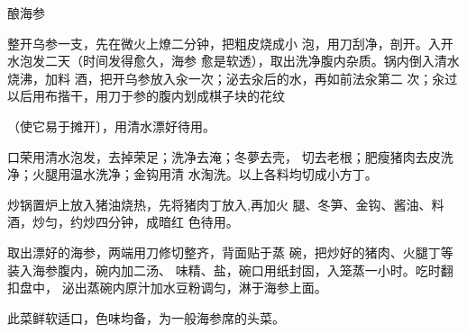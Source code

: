 \begin{recipe}[一品海参]{酿海参}

\ingredients


\cooking

\step 整开乌参一支，先在微火上燎二分钟，把粗皮烧成小 泡，用刀刮净，剖开。入开水泡发二天（时间发得愈久，海参 愈是软透），取出洗净腹内杂质。锅内倒入清水烧沸，加料 酒，把开乌参放入汆一次；泌去汆后的水，再如前法汆第二 次；汆过以后用布揩干，用刀于参的腹内划成棋子块的花纹

（使它易于摊开〕，用清水漂好待用。

\step 口荣用清水泡发，去掉荣足；洗净去淹；冬夢去壳， 切去老根；肥瘦猪肉去皮洗净；火腿用温水洗净；金钩用清 水淘洗。以上各料均切成小方丁。

\step 炒锅置炉上放入猪油烧热，先将猪肉丁放入,再加火 腿、冬笋、金钩、酱油、料酒，炒匀，约炒四分钟，成暗红 色待用。

取出漂好的海参，两端用刀修切整齐，背面贴于蒸 碗，把炒好的猪肉、火腿丁等装入海参腹内，碗内加二汤、 味精、盐，碗口用纸封固，入笼蒸一小时。吃时翻扣盘中， 泌出蒸碗内原汁加水豆粉调匀，淋于海参上面。

\notes

此菜鲜软适口，色味均备，为一般海参席的头菜。

\end{recipe}

